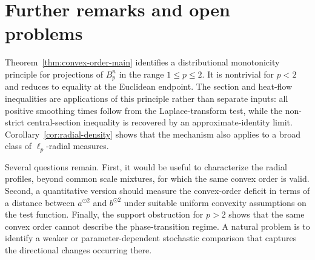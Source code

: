 \documentclass[pdflatex,sn-mathphys-num]{sn-jnl}
\numberwithin{equation}{section}
\theoremstyle{thmstyleone}
\theoremstyle{thmstylethree}
\newcommand{\1}{\mathbf{1}}
\newcommand{\sqvec}[1]{#1^{\odot 2}}
\begin{document}
\section{Further remarks and open problems}\label{sec:discussion}

Theorem~\ref{thm:convex-order-main} identifies a distributional
monotonicity principle for projections of $B_p^n$ in the range
$1\le p\le2$. It is nontrivial for $p<2$ and reduces to equality at
the Euclidean endpoint. The section and heat-flow inequalities are applications of
this principle rather than separate inputs: all positive smoothing
times follow from the Laplace-transform test, while the non-strict
central-section inequality is recovered by an approximate-identity
limit. Corollary~\ref{cor:radial-density} shows that the mechanism also
applies to a broad class of $\ell_p$-radial measures.

Several questions remain. First, it would be useful to characterize
the radial profiles, beyond common scale mixtures, for which the same
convex order is valid. Second, a quantitative version should measure
the convex-order deficit in terms of a distance between
$\sqvec a$ and $\sqvec b$ under suitable uniform convexity assumptions
on the test function. Finally, the support obstruction for $p>2$
shows that the same convex order cannot describe the phase-transition
regime. A natural problem is to identify a weaker or
parameter-dependent stochastic comparison that captures the
directional changes occurring there.

\backmatter
\end{document}
